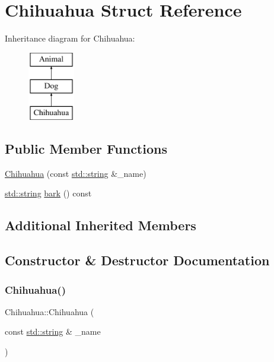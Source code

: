 \hypertarget{struct_chihuahua}{}\section{Chihuahua Struct Reference}
\label{struct_chihuahua}
Inheritance diagram for Chihuahua\+:\begin{figure}[H]
\begin{center}
\leavevmode
\includegraphics[height=3.000000cm]{struct_chihuahua}
\end{center}
\end{figure}
\subsection*{Public Member Functions}
\begin{DoxyCompactItemize}
\item 
\mbox{\hyperlink{struct_chihuahua_a2a386e148b1ac402ebca161a32d3325b}{Chihuahua}} (const \mbox{\hyperlink{_s_d_l__opengl__glext_8h_ab4ccfaa8ab0e1afaae94dc96ef52dde1}{std\+::string}} \&\+\_\+name)
\item 
\mbox{\hyperlink{_s_d_l__opengl__glext_8h_ab4ccfaa8ab0e1afaae94dc96ef52dde1}{std\+::string}} \mbox{\hyperlink{struct_chihuahua_acb6fbe8393fcaf91ba3e093747408834}{bark}} () const
\end{DoxyCompactItemize}
\subsection*{Additional Inherited Members}


\subsection{Constructor \& Destructor Documentation}
\mbox{\label{struct_chihuahua_a2a386e148b1ac402ebca161a32d3325b}} 
\subsubsection{\texorpdfstring{Chihuahua()}{Chihuahua()}}
{\footnotesize\ttfamily Chihuahua\+::\+Chihuahua (\begin{DoxyParamCaption}\item[{const \mbox{\hyperlink{_s_d_l__opengl__glext_8h_ab4ccfaa8ab0e1afaae94dc96ef52dde1}{std\+::string}} \&}]{\+\_\+name }\end{DoxyParamCaption})\hspace{0.3cm}{\ttfamily [inline]}}



